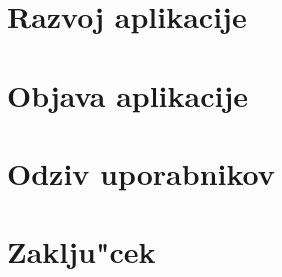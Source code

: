 \documentclass[a4paper, 12pt]{article}
\begin{document}
	\section{Razvoj aplikacije}
	
	
	\section{Objava aplikacije}
	
	
	\section{Odziv uporabnikov}
	
	
	\section{Zaklju"cek}
	
\end{document}

